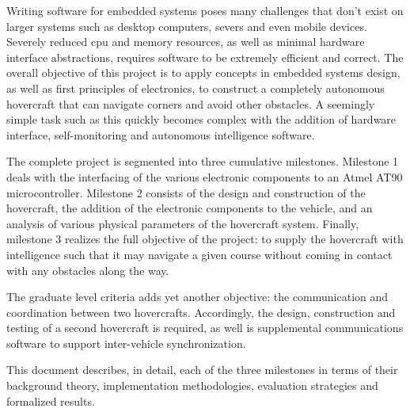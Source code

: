 Writing software for embedded systems poses many challenges that don't exist on larger systems such as desktop computers, severs and even mobile devices.  Severely reduced cpu and memory resources, as well as minimal hardware interface abstractions, requires software to be extremely efficient and correct.  The overall objective of this project is to apply concepts in embedded systems design, as well as first principles of electronics, to construct a completely autonomous hovercraft that can navigate corners and avoid other obstacles.  A seemingly simple task such as this quickly becomes complex with the addition of hardware interface, self-monitoring and autonomous intelligence software.  

The complete project is segmented into three cumulative milestones.  Milestone 1 deals with the interfacing of the various electronic components to an Atmel AT90 microcontroller.  Milestone 2 consists of the design and construction of the hovercraft, the addition of the electronic components to the vehicle, and an analysis of various physical parameters of the hovercraft system.  Finally, milestone 3 realizes the full objective of the project: to supply the hovercraft with intelligence such that it may navigate a given course without coming in contact with any obstacles along the way.  

The graduate level criteria adds yet another objective: the communication and coordination between two hovercrafts.  Accordingly, the design, construction and testing of a second hovercraft is required, as well is supplemental communications software to support inter-vehicle synchronization.

This document describes, in detail, each of the three milestones in terms of their background theory, implementation methodologies, evaluation strategies and formalized results.  
